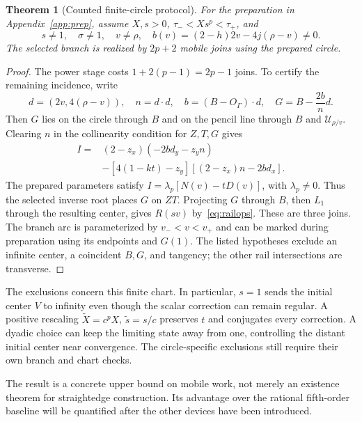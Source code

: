 \documentclass[11pt,a4paper]{article}
\newtheorem{theorem}{Theorem}[section]\newtheorem{proposition}[theorem]{Proposition}
\newcommand{\hub}[1]{\mathcal U_{#1}}
\begin{document}
\begin{theorem}[Counted finite-circle protocol]\label{thm:construction}
For the preparation in Appendix~\ref{app:prep}, assume $X,s>0$, $\tau_-<Xs^p<\tau_+$, and
\[
 s\ne1,\quad \sigma\ne1,\quad v\ne\rho,\quad
 b(v)=(2-h)2v-4j(\rho-v)\ne0.
\]
The selected branch is realized by $2p+2$ mobile joins using the prepared circle.
\end{theorem}
\begin{proof}
The power stage costs $1+2(p-1)=2p-1$ joins. To certify the remaining incidence, write
\[
 d=(2v,4(\rho-v)),\quad n=d\cdot d,\quad b=(B-O_\Gamma)\cdot d,
 \quad G=B-\frac{2b}{n}d.
\]
Then $G$ lies on the circle through $B$ and on the pencil line through $B$ and $\hub{\rho/v}$. Clearing $n$ in the collinearity condition for $Z,T,G$ gives
\begin{align*}
 I={}&(2-z_x)(-2bd_y-z_yn)\\
 &-[4(1-kt)-z_y][(2-z_x)n-2bd_x].
\end{align*}
The prepared parameters satisfy $I=\lambda_p[N(v)-tD(v)]$, with $\lambda_p\ne0$. Thus the selected inverse root places $G$ on $ZT$. Projecting $G$ through $B$, then $L_1$ through the resulting center, gives $R(sv)$ by~\eqref{eq:railops}. These are three joins. The branch arc is parameterized by $v_-<v<v_+$ and can be marked during preparation using its endpoints and $G(1)$. The listed hypotheses exclude an infinite center, a coincident $B,G$, and tangency; the other rail intersections are transverse.
\end{proof}
The exclusions concern this finite chart. In particular, $s=1$ sends the initial center $V$ to infinity even though the scalar correction can remain regular. A positive rescaling $\widetilde X=c^pX$, $\widetilde s=s/c$ preserves $t$ and conjugates every correction. A dyadic choice can keep the limiting state away from one, controlling the distant initial center near convergence. The circle-specific exclusions still require their own branch and chart checks.

The result is a concrete upper bound on mobile work, not merely an existence theorem for straightedge construction. Its advantage over the rational fifth-order baseline will be quantified after the other devices have been introduced.
\clearpage
\end{document}

